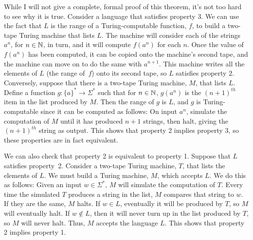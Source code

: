 While I will not give a complete, formal proof of this theorem, it's not
too hard to see why it is true.  Consider a language that satisfies
property 3.  We can use the fact that $L$ is the range of a Turing-computable function, $f$,
to build a two-tape Turing machine that lists $L$.  The machine will
consider each of the strings $a^n$, for $n\in {\mathbb N}$, in turn, and it will compute
$f(a^n)$ for each $n$.  Once the value of $f(a^n)$ has been computed, it can be copied
onto the machine's second tape, and the machine can move on to do the same
with $a^{n+1}$.  This machine writes all the elements of $L$ 
(the range of~$f$) onto its second tape,
so $L$ satisfies property 2.  Conversely, suppose that
there is a two-tape Turing machine, $M$, that lists $L$.  Define a function
$g\colon\{a\}^*\to\Sigma^*$ such that for $n\in{\mathbb N}$, $g(a^n)$ is the $(n+1)^{th}$ item in the
list produced by $M$.  Then the range of $g$ is $L$, and $g$ is Turing-computable
since it can be computed as follows:  On input $a^n$, simulate the computation
of $M$ until it has produced $n+1$ strings, then halt, giving the $(n+1)^{th}$
string as output.  This shows that property 2 implies property 3, so these
properties are in fact equivalent.

We can also check that property 2 is equivalent to property 1. 
Suppose that $L$ satisfies property~2. Consider
a two-tape Turing machine, $T$, that lists the elements of $L$.  We must build
a Turing machine, $M$, which accepts $L$. We do this
as follows:  Given an input $w\in\Sigma^*$,
$M$ will simulate the computation of $T$.  Every time the simulated $T$ produces a string
in the list, $M$ compares that string to $w$.  If they are the same, $M$ halts.
If $w\in L$, eventually it will be produced by $T$, so $M$ will eventually halt.
If $w\not\in L$, then it will never turn up in the list produced by $T$, so
$M$ will never halt.  Thus, $M$ accepts the language $L$.  This shows that
property 2 implies property 1.  

